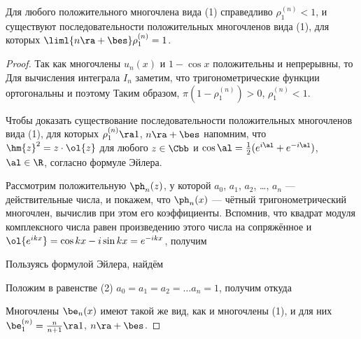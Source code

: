 \documentclass[a4paper]{article}
\begin{document}
\begin{theorem}
Для любого положительного многочлена вида (1) справедливо
$\rho_1^{(n)}<1$, и существуют последовательности положительных
многочленов вида (1), для которых $\liml{n\ra+\bes} \rho_1^{(n)} =
1$.
\end{theorem}

\begin{proof}
Так как многочлены $u_n(x)$ и $1-\cos x$ положительны и непрерывны,
то  Для вычисления
интеграла $I_n$ заметим, что тригонометрические функции ортогональны
и поэтому  Таким
образом, $\pi (1-\rho_1^{(n)})>0$, $\rho_1^{(n)}<1$.

Чтобы доказать существование последовательности положительных
многочленов вида (1), для которых $\rho_1^{(n)}\ra1$, $n\ra+\bes$
напомним, что $\hm{z}^2=z\cdot\ol{z}$ для любого $z\in\Cbb$ и
$\cos\al=\frac12 (e^{i\al} + e^{-i\al})$, $\al\in\R$, согласно
формуле Эйлера.

Рассмотрим положительную $\ph_n(z)$,  у которой
$a_0$, $a_1$, $a_2$, \ldots, $a_n$ --- действительные числа, и
покажем, что $\ph_n(x)$ --- чётный тригонометрический многочлен,
вычислив при этом его коэффициенты. Вспомнив, что квадрат модуля
комплексного числа равен произведению этого числа на сопряжённое и
$\ol{e^{ikx}} = \cos kx - i\sin kx = e^{-ikx}$, получим 

Пользуясь формулой Эйлера, найдём 

Положим в равенстве (2) $a_0=a_1=a_2 = \ldots a_n = 1$, получим
откуда 

Многочлены $\be_n(x)$ имеют такой же вид, как и многочлены (1), и
для них $\be_1^{(n)} = \frac{n}{n+1}\ra1$, $n\ra+\bes$.
\end{proof}
\end{document}
